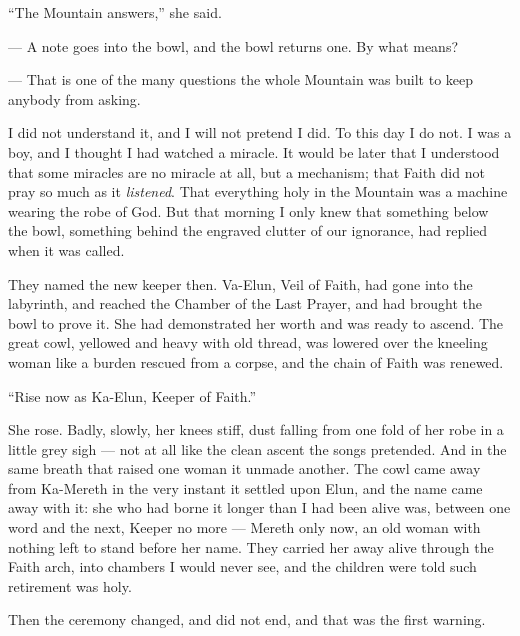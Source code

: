 ``The Mountain answers,'' she said.\par

\begin{room}

--- A note goes into the bowl, and the bowl returns one. By what means?

--- That is one of the many questions the whole Mountain was built to keep anybody from asking.

\end{room}

I did not understand it, and I will not pretend I did. To this day I do not.
I was a boy, and I thought I had watched a miracle. 
It would be later that I understood that some miracles are no miracle at all, but a mechanism; 
that Faith did not pray so much as it \textit{listened}. 
That everything holy in the Mountain was a machine wearing the robe of God. 
But that morning I only knew that something below the bowl, something behind the engraved clutter of our ignorance, had replied when it was called.\par

They named the new keeper then. 
Va-Elun, Veil of Faith, had gone into the labyrinth, and reached the Chamber of the Last Prayer, and had brought the bowl to prove it. 
She had demonstrated her worth and was ready to ascend.
The great cowl, yellowed and heavy with old thread, was lowered over the kneeling woman like a burden rescued from a corpse, 
and the chain of Faith was renewed.\par

``Rise now as Ka-Elun, Keeper of Faith.''\par

She rose. 
Badly, slowly, her knees stiff, dust falling from one fold of her robe in a little grey sigh --- not at all like the clean ascent the songs pretended. 
And in the same breath that raised one woman it unmade another.
The cowl came away from Ka-Mereth in the very instant it settled upon Elun, and the name came away with it: 
she who had borne it longer than I had been alive was, between one word and the next, 
Keeper no more --- Mereth only now, an old woman with nothing left to stand before her name.
They carried her away alive through the Faith arch, into chambers I would never see, and the children were told such retirement was holy.\par

\ornament

Then the ceremony changed, and did not end, and that was the first warning.\par

